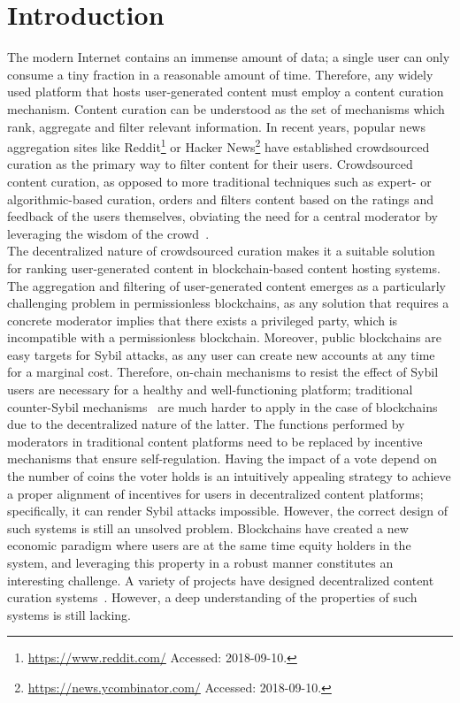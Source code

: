 \section{Introduction}
    
  The modern Internet contains an immense amount of data; a single user can only consume a tiny fraction in a reasonable amount of time. Therefore, any widely used platform that hosts user-generated content must employ a content curation mechanism. 
   Content curation can be understood as the set of mechanisms which rank, aggregate and filter relevant information. In recent years, popular news aggregation sites like Reddit\footnote{\url{https://www.reddit.com/} Accessed: 2018-09-10.} or Hacker News\footnote{\url{https://news.ycombinator.com/} Accessed: 2018-09-10.} have established crowdsourced curation as the primary way to filter content for their users.  
   Crowdsourced content curation, as opposed to more traditional techniques such as expert- or algorithmic-based curation, orders and filters content based on the ratings and feedback of the users themselves, obviating the need for a central moderator by leveraging the wisdom of the crowd~\citep{askalidis2013theoretical}.\\
   
  The decentralized nature of crowdsourced curation makes it a suitable solution for ranking user-generated content in blockchain-based content hosting systems. The aggregation and filtering of user-generated content emerges as a particularly challenging problem in permissionless blockchains, as any solution that requires a concrete moderator implies that there exists a privileged party, which is incompatible with a permissionless blockchain.
   Moreover, public blockchains are easy targets for Sybil attacks, as any user can create new accounts at any time for a marginal cost.
    Therefore, on-chain mechanisms to resist the effect of Sybil users are necessary for a healthy and well-functioning platform; traditional counter-Sybil mechanisms~\cite{levine2006survey} are much harder to apply in the case of blockchains due to the decentralized nature of the latter. 
   The functions performed by moderators in traditional content platforms need to be replaced by incentive mechanisms that ensure self-regulation. Having the impact of a vote depend on the number of coins the voter holds is an intuitively appealing strategy to achieve a proper alignment of incentives for users in decentralized content platforms; specifically, it can render Sybil attacks impossible. 
   However, the correct design of such systems is still an unsolved problem. Blockchains have created a new economic paradigm where users are at the same time equity holders in the system, and leveraging this property in a robust manner constitutes an interesting challenge. 
   A variety of projects have designed decentralized content curation systems~\cite{synereo,steemit,tcr}. However, a deep understanding of the properties of such systems is still lacking.\\
  
